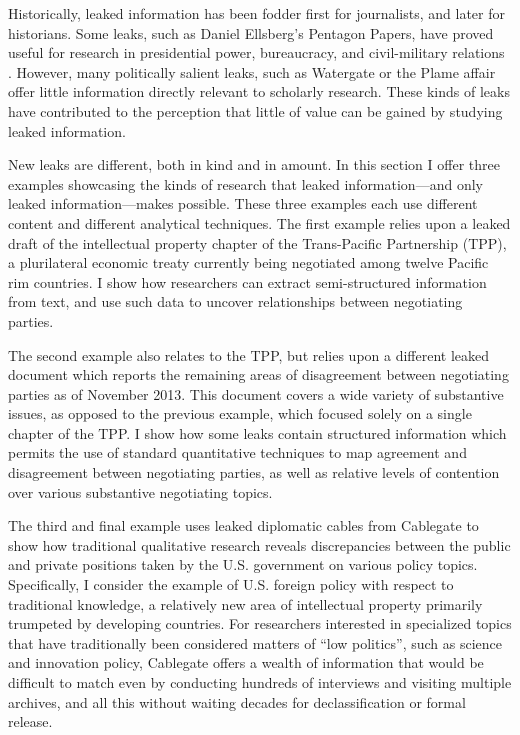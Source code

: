 \documentclass[12pt]{article}
\begin{document}
Historically, leaked information has been fodder first for journalists, and later for historians. 
Some leaks, such as Daniel Ellsberg's Pentagon Papers, have proved useful for research in 
presidential power, bureaucracy, and civil-military relations \citep{schwab2006clash,stevenson2006warriors}. However, many politically salient 
leaks, such as Watergate or the Plame affair offer little information directly relevant to scholarly research. 
These kinds of leaks have contributed to the perception that little of value can be gained by studying leaked information. 

New leaks are different, both in kind and in amount. In this section I offer three examples showcasing the kinds of research that 
leaked information---and only leaked information---makes possible. These three examples each use different content and different 
analytical techniques. The first example relies upon a leaked draft of the intellectual property 
chapter of the Trans-Pacific 
Partnership (TPP), a plurilateral economic treaty currently being negotiated among twelve Pacific rim 
countries. I show how researchers can extract semi-structured information from text, and use such data 
to uncover relationships between negotiating parties.

The second example also relates to the TPP, but relies upon a different leaked document which reports  
the remaining areas of disagreement between negotiating parties as of November 2013. This document  
covers a wide variety of substantive issues, as opposed to the previous example, which focused solely 
on a single chapter of the TPP. I show how some leaks contain structured information which 
permits the use of standard quantitative techniques to map agreement and disagreement between negotiating 
parties, as well as relative levels of contention over various substantive negotiating topics. 

The third and final example uses leaked diplomatic cables from Cablegate to show how traditional
qualitative research reveals discrepancies between the 
public and private positions taken by the U.S. government on various policy topics. Specifically, I consider 
the example of U.S. foreign policy with respect to traditional knowledge, a relatively new area of intellectual 
property primarily trumpeted by developing countries. For researchers interested in specialized topics 
that have traditionally been considered matters of ``low politics'', such as science and innovation policy, 
Cablegate offers a wealth of information that would be difficult to match even by conducting hundreds of 
interviews and visiting multiple archives, and all this without waiting decades for declassification or formal release.
\end{document}
